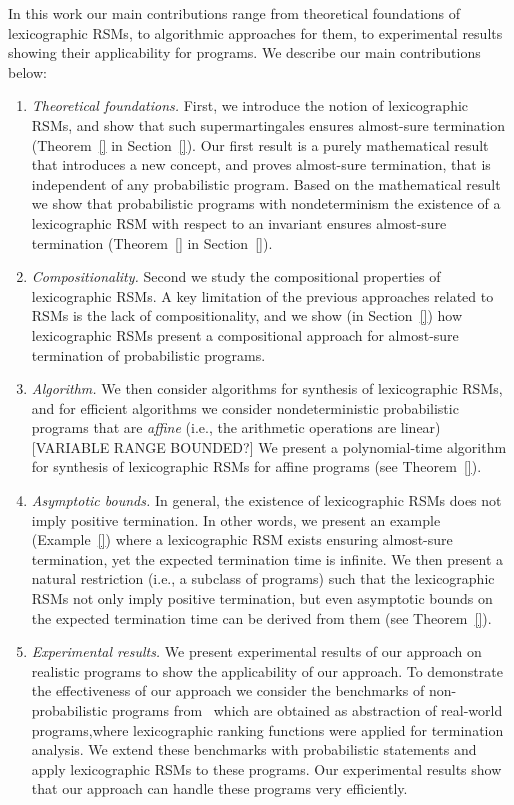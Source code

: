 \smallskip{} 
In this work our main contributions range from theoretical foundations of lexicographic
RSMs, to algorithmic approaches for them, to experimental results
showing their applicability for programs.
We describe our main contributions below:
\begin{enumerate}

\item {\em Theoretical foundations.} 
First, we introduce the notion of lexicographic RSMs, and show that
such supermartingales ensures almost-sure termination (Theorem~\ref{} in Section~\ref{}). 
Our first result is a purely mathematical result that introduces a new concept, and 
proves almost-sure termination, that is independent of any probabilistic program.
Based on the mathematical result we show that probabilistic programs with nondeterminism
the existence of a lexicographic RSM with respect to an invariant ensures
almost-sure termination (Theorem~\ref{} in Section~\ref{}).

\item {\em Compositionality.} 
Second we study the compositional properties of lexicographic RSMs.
A key limitation of the previous approaches related to RSMs is the lack 
of compositionality, and we show (in Section~\ref{}) how lexicographic RSMs 
present a compositional approach for almost-sure termination of probabilistic programs.

\item {\em Algorithm.} We then consider algorithms for synthesis of lexicographic RSMs, 
and for efficient algorithms we consider nondeterministic probabilistic 
programs that are {\em affine} (i.e., the arithmetic operations are linear)
[VARIABLE RANGE BOUNDED?]
We present a polynomial-time algorithm for synthesis of lexicographic RSMs 
for affine programs (see Theorem~\ref{}).


\item {\em Asymptotic bounds.} 
In general, the existence of lexicographic RSMs does not imply positive
termination. 
In other words, we present an example (Example~\ref{}) where a lexicographic RSM exists ensuring
almost-sure termination, yet the expected termination time is infinite.
We then present a natural restriction (i.e., a subclass of programs) such that the lexicographic 
RSMs not only imply positive termination, but even asymptotic bounds on the expected termination 
time can be derived from them (see Theorem~\ref{}).


\item {\em Experimental results.} 
We present experimental results of our approach on realistic programs to show the applicability 
of our approach. 
To demonstrate the effectiveness of our approach we consider the benchmarks of non-probabilistic
programs from~\cite{} which are obtained as abstraction of real-world programs,where 
lexicographic ranking functions were applied for termination analysis. 
We extend these benchmarks with probabilistic statements and apply lexicographic RSMs to these
programs. 
Our experimental results show that our approach can handle these programs very efficiently.


\end{enumerate}





